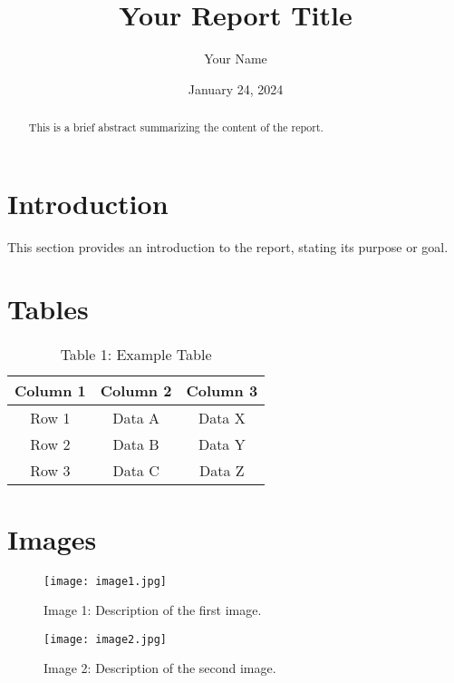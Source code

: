 \documentclass[letterpaper, 12pt]{article}
\title{Your Report Title}
\author{Your Name}
\date{January 24, 2024}
\begin{document}
    \maketitle

    \begin{abstract}
        
    This is a brief abstract summarizing the content of the report.
    
    \end{abstract}

    \section{Introduction}
        
    This section provides an introduction to the report, stating its purpose or goal.
    

        
    \section{Tables}
    \begin{table}[ht]
        \centering
        \begin{tabular}{|c|c|c|}
            \hline
            Column 1 & Column 2 & Column 3 \\
            \hline
            Row 1 & Data A & Data X \\
            Row 2 & Data B & Data Y \\
            Row 3 & Data C & Data Z \\
            \hline
        \end{tabular}
        \caption{Table 1: Example Table}
        \label{tab:table1}
    \end{table}
    

        
    \section{Images}
    \begin{figure}[ht]
        \centering
        \texttt{[image: image1.jpg]}
        \caption{Image 1: Description of the first image.}
        \label{fig:image1}
    \end{figure}

    \begin{figure}[ht]
        \centering
        \texttt{[image: image2.jpg]}
        \caption{Image 2: Description of the second image.}
        \label{fig:image2}
    \end{figure}
\end{document}
